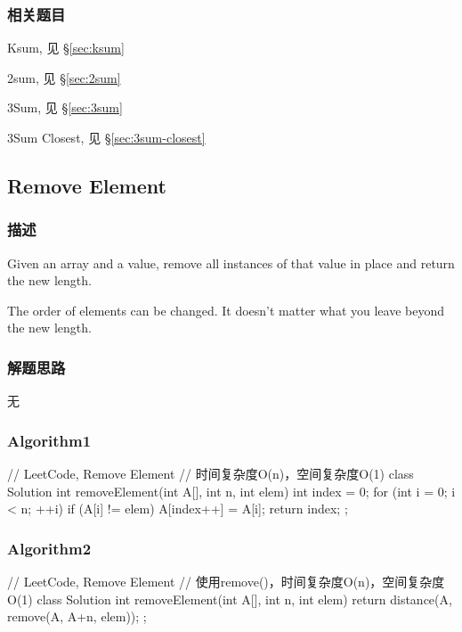 \subsubsection{相关题目}
\begindot
\item Ksum, 见 \S \ref{sec:ksum}
\item 2sum, 见 \S \ref{sec:2sum}
\item 3Sum, 见 \S \ref{sec:3sum}
\item 3Sum Closest, 见 \S \ref{sec:3sum-closest}
\myenddot


\subsection{Remove Element} %
\label{sec:remove-element }


\subsubsection{描述}
Given an array and a value, remove all instances of that value in place and 
return the new length.

The order of elements can be changed. It doesn't matter what you leave beyond 
the new length.


\subsubsection{解题思路}
无


\subsubsection{Algorithm1}
\begin{Code}
	// LeetCode, Remove Element
	// 时间复杂度O(n)，空间复杂度O(1)
	class Solution {
		int removeElement(int A[], int n, int elem) {
			int index = 0;
			for (int i = 0; i < n; ++i) {
				if (A[i] != elem) 
					A[index++] = A[i];
			}
			return index;
		}
	};
\end{Code}


\subsubsection{Algorithm2}
\begin{Code}
	// LeetCode, Remove Element
	// 使用remove()，时间复杂度O(n)，空间复杂度O(1)
	class Solution {
		int removeElement(int A[], int n, int elem) {
			return distance(A, remove(A, A+n, elem));
		}
	};
\end{Code}


